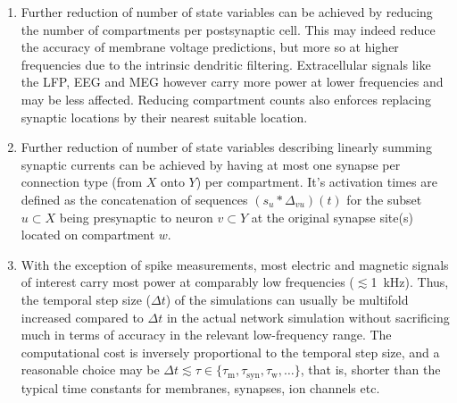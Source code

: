 \begin{enumerate}
\item Further reduction of number of state variables can be achieved by reducing the number of compartments per postsynaptic cell. This may indeed reduce the accuracy of membrane voltage predictions, but more so at higher frequencies due to the intrinsic dendritic filtering. Extracellular signals like the LFP, EEG and MEG however carry more power at lower frequencies and may be less affected. Reducing compartment counts also enforces replacing synaptic locations by their nearest suitable location.

\item Further reduction of number of state variables describing linearly summing synaptic currents can be achieved by having at most one synapse per connection type (from $X$ onto $Y$) per compartment.
It's activation times are defined as the concatenation of sequences $\left(s_u \ast \Delta_{vu} \right)(t)$ for the subset $u \subset X$ being presynaptic to neuron $v \subset Y$ at the original synapse site(s) located on  compartment $w$.

\item With the exception of spike measurements, most electric and magnetic signals of interest carry most power at comparably low frequencies ($\lesssim$\SI{1}{\kilo\hertz}).
Thus, the temporal step size ($\Delta t$) of the simulations can usually be multifold increased compared to $\Delta t$ in the actual network simulation without sacrificing much in terms of accuracy in the relevant low-frequency range.
The computational cost is inversely proportional to the temporal step size,
and a reasonable choice may be $\Delta t \lesssim \tau \in \{ \tau_\mathrm{m}, \tau_\mathrm{syn}, \tau_\mathrm{w}, \ldots \}$,
that is, shorter than the typical time constants for membranes, synapses, ion channels etc.

\end{enumerate}




